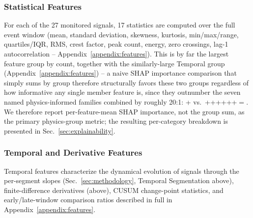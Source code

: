 \subsubsection{Statistical Features}

For each of the 27 monitored signals, 17 statistics are computed over the full event window %
(mean, standard deviation, skewness, kurtosis, min/max/range, quartiles/IQR, RMS, crest factor, peak count, energy, zero crossings, lag-1 autocorrelation -- Appendix~\ref{appendix:features}). %
This is by far the largest feature group by count, together with the similarly-large Temporal group (Appendix~\ref{appendix:features}) -- a naive SHAP importance comparison that simply sums by group therefore structurally favors these two groups regardless of how informative any single member feature is, since they outnumber the seven named physics-informed families combined by roughly 20:1: %
\MetricOneZeroPhysicsGroupShapNFeaturesStatistical{} + \MetricOneZeroPhysicsGroupShapNFeaturesTemporal{} vs.\ \MetricOneZeroPhysicsGroupShapNFeaturesEffectiveDecay{}+\MetricOneZeroPhysicsGroupShapNFeaturesDetuning{}+\MetricOneZeroPhysicsGroupShapNFeaturesMicrophonics{}+\MetricOneZeroPhysicsGroupShapNFeaturesRfMismatch{}+\MetricOneZeroPhysicsGroupShapNFeaturesModulatorCommand{}+\MetricOneZeroPhysicsGroupShapNFeaturesPhaseStability{}+\MetricOneZeroPhysicsGroupShapNFeaturesRfPowerFlow{}$={}$\MetricOneZeroPhysicsGroupShapNFeaturesPhysicsInformedTotal{}. We therefore report per-feature-mean SHAP importance, not the group sum, as the primary physics-group metric; the resulting per-category breakdown is presented in Sec.~\ref{sec:explainability}.

\subsubsection{Temporal and Derivative Features}

Temporal features characterize the dynamical evolution of signals through the per-segment slopes (Sec.~\ref{sec:methodology}, Temporal Segmentation above), finite-difference derivatives (above), CUSUM change-point statistics, and early/late-window comparison ratios described in full in Appendix~\ref{appendix:features}.

